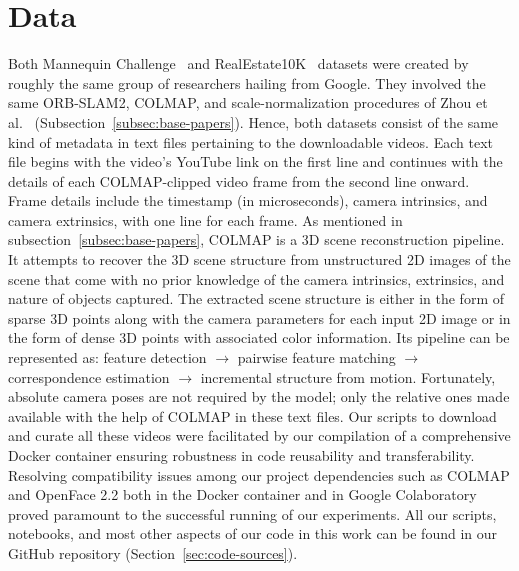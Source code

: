 \section{Data}\label{sec:data} 

Both Mannequin Challenge~\cite{li2019learning} and RealEstate10K~\cite{zhou2018stereo} datasets were created by roughly the same group of researchers hailing from Google. They involved the same ORB-SLAM2, COLMAP, and scale-normalization procedures of Zhou et al.~\cite{zhou2018stereo} (Subsection~\ref{subsec:base-papers}). Hence, both datasets consist of the same kind of metadata in text files pertaining to the downloadable videos. Each text file begins with the video’s YouTube link on the first line and continues with the details of each COLMAP-clipped video frame from the second line onward. Frame details include the timestamp (in microseconds), camera intrinsics, and camera extrinsics, with one line for each frame. As mentioned in subsection~\ref{subsec:base-papers}, COLMAP is a 3D scene reconstruction pipeline. It attempts to recover the 3D scene structure from unstructured 2D images of the scene that come with no prior knowledge of the camera intrinsics, extrinsics, and nature of objects captured. The extracted scene structure is either in the form of sparse 3D points along with the camera parameters for each input 2D image or in the form of dense 3D points with associated color information. Its pipeline can be represented as: feature detection $\rightarrow$ pairwise feature matching  $\rightarrow$ correspondence estimation $\rightarrow$ incremental structure from motion. Fortunately, absolute camera poses are not required by the model; only the relative ones made available with the help of COLMAP in these text files. Our scripts to download and curate all these videos were facilitated by our compilation of a comprehensive Docker container ensuring robustness in code reusability and transferability. Resolving compatibility issues among our project dependencies such as COLMAP and OpenFace 2.2 both in the Docker container and in Google Colaboratory proved paramount to the successful running of our experiments. All our scripts, notebooks, and most other aspects of our code in this work can be found in our GitHub repository (Section~\ref{sec:code-sources}).
    
